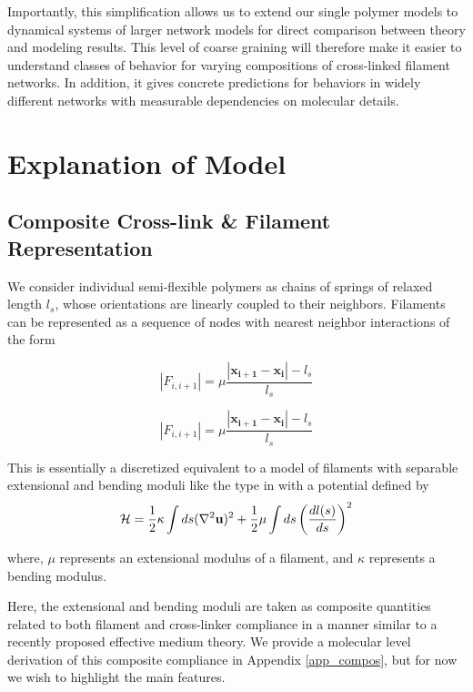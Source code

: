 \documentclass[pre,preprint]{revtex4-1}
\begin{document}
Importantly, this simplification allows us to extend our single polymer models to dynamical systems of larger network models for direct comparison between theory and modeling results.  This level of coarse graining will therefore make it easier to understand classes of behavior for varying compositions of cross-linked filament networks.  In addition, it gives concrete predictions for behaviors in widely different networks with measurable dependencies on molecular details.

\section{Explanation of Model}

\subsection{Composite Cross-link \& Filament Representation}
We consider individual semi-flexible polymers as chains of springs of relaxed length $l_s$, whose orientations are linearly coupled to their neighbors. Filaments can be represented as a sequence of nodes with nearest neighbor interactions of the form

\begin{equation}
|F_{i,i+1}| = \mu\frac{|\mathbf{x_{i+1}}-\mathbf{x_i}|-l_s}{l_s} 
\end{equation}

\begin{equation}
|F_{i,i+1}| = \mu\frac{|\mathbf{x_{i+1}}-\mathbf{x_i}|-l_s}{l_s} 
\end{equation}

This is essentially a discretized equivalent to a model of filaments with separable extensional and bending moduli like the type in \cite{theo_hlm} with a potential defined by
\begin{equation}
{\cal H} =\frac{1}{2}\kappa \int ds(\nabla^2\mathbf{u})^2 + \frac{1}{2}\mu \int ds \left ( \frac{dl(s) }{ds} \right )^2
\end{equation}

where, $\mu$ represents an extensional modulus of a filament, and $\kappa$ represents a bending modulus.   

Here, the extensional and bending moduli are taken as composite quantities related to both filament and cross-linker compliance in a manner similar to a recently proposed effective medium theory\cite{theo_crosslinknonlinear}.  We provide a molecular level derivation of this composite compliance in Appendix \ref{app_compos}, but for now we wish to highlight the main features.  
\end{document}
